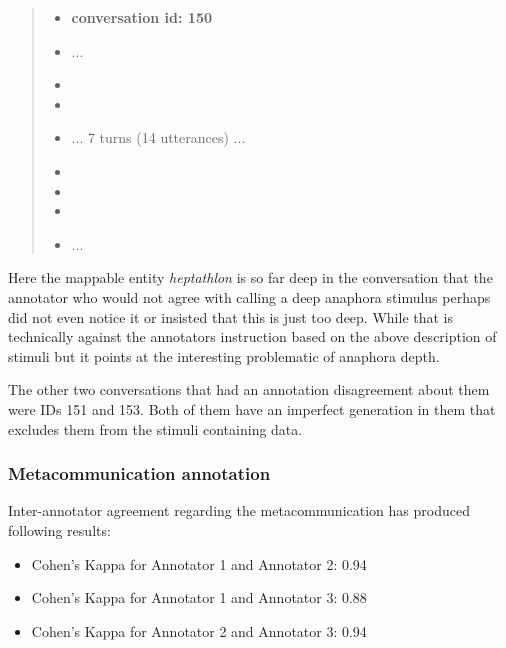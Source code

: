 \begin{quote}
\begin{itemize}[label={}, leftmargin=0pt, itemsep=0.5em]
\item \textbf{conversation id: 150}
\item ...
\item {}
\item {}
\item ... 7 turns (14 utterances) ...
\item {}
\item {}
\item {}
\item ...
\end{itemize}
\end{quote}

Here the mappable entity \textit{heptathlon} is so far deep in the conversation that
the annotator who would not agree with calling a deep anaphora stimulus
perhaps did not even notice it or insisted that this is just too deep.
While that is technically against the annotators instruction based on the above description of stimuli
but it points at the interesting problematic of anaphora depth.

The other two conversations that had an annotation disagreement about them were IDs 151 and 153.
Both of them have an imperfect generation in them that excludes them from the stimuli containing data.

\subsubsection{Metacommunication annotation}

Inter-annotator agreement regarding the metacommunication has produced following results:

\begin{itemize}[label={}]
\item Cohen's Kappa for Annotator 1 and Annotator 2: 0.94
\item Cohen's Kappa for Annotator 1 and Annotator 3: 0.88
\item Cohen's Kappa for Annotator 2 and Annotator 3: 0.94
\end{itemize}

